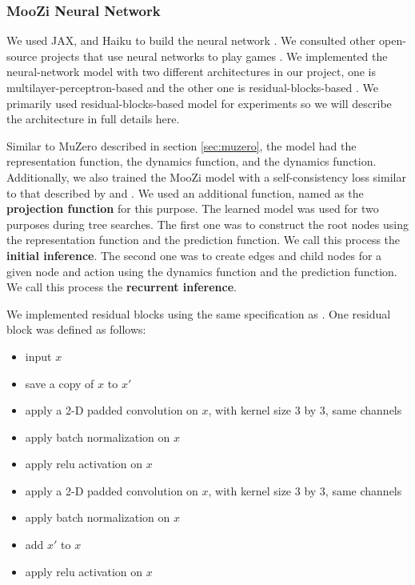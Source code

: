 \subsubsection{MooZi Neural Network} \label{sec:nn}
We used JAX, and Haiku to build the neural network \cite{HaikuSonnetJAX_Hennigan.Cai.ea_2020,CompilingMachineLearning_Frostig.Johnson.ea_2019,JAXComposableTransformations_JamesBradbury.RoyFrostig.ea_2018}.
We consulted other open-source projects that use neural networks to play games \cite{MuZeroGeneral_Duvaud.AureleHainaut_2022, MasteringAtariGames_Ye.Liu.ea_2021, AcceleratingSelfPlayLearning_Wu_2020}.
We implemented the neural-network model with two different architectures in our project, one is multilayer-perceptron-based and the other one is residual-blocks-based \cite{DeepResidualLearning_He.Zhang.ea_2016}.
We primarily used residual-blocks-based model for experiments so we will describe the architecture in full details here.

Similar to MuZero described in section \ref{sec:muzero}, the model had the representation function, the dynamics function, and the dynamics function.
Additionally, we also trained the MooZi model with a self-consistency loss similar to that described by \citeauthor{MasteringAtariGames_Ye.Liu.ea_2021} and \citeauthor{VisualizingMuZeroModels_deVries.Voskuil.ea_2021} \cite{MasteringAtariGames_Ye.Liu.ea_2021,VisualizingMuZeroModels_deVries.Voskuil.ea_2021}.
We used an additional function, named as the \textbf{projection function} for this purpose.
The learned model was used for two purposes during tree searches.
The first one was to construct the root nodes using the representation function and the prediction function.
We call this process the \textbf{initial inference}.
The second one was to create edges and child nodes for a given node and action using the dynamics function and the prediction function.
We call this process the \textbf{recurrent inference}.

We implemented residual blocks using the same specification as \citeauthor{DeepResidualLearning_He.Zhang.ea_2016} \cite{DeepResidualLearning_He.Zhang.ea_2016}.
One residual block was defined as follows:
\begin{itemize}
    \item input $x$
    \item save a copy of $x$ to $x'$
    \item apply a 2-D padded convolution on $x$, with kernel size 3 by 3, same channels
    \item apply batch normalization on $x$
    \item apply relu activation on $x$
    \item apply a 2-D padded convolution on $x$, with kernel size 3 by 3, same channels
    \item apply batch normalization on $x$
    \item add $x'$ to $x$
    \item apply relu activation on $x$
\end{itemize}

